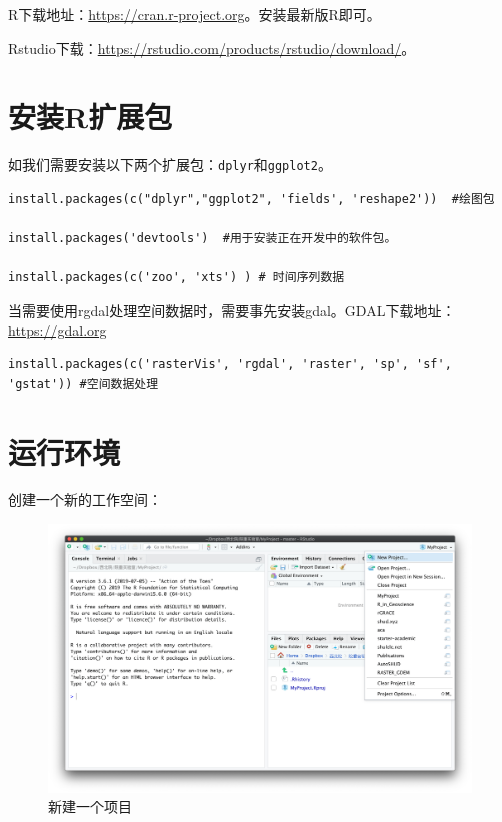 \documentclass[]{scrbook}
\begin{document}
R下载地址：\url{https://cran.r-project.org}。安装最新版R即可。

Rstudio下载：\url{https://rstudio.com/products/rstudio/download/}。

\hypertarget{ux5b89ux88c5rux6269ux5c55ux5305}{%
\section{安装R扩展包}\label{ux5b89ux88c5rux6269ux5c55ux5305}}

如我们需要安装以下两个扩展包：\texttt{dplyr}和\texttt{ggplot2}。

\begin{verbatim}
install.packages(c("dplyr","ggplot2", 'fields', 'reshape2'))  #绘图包

install.packages('devtools')  #用于安装正在开发中的软件包。

install.packages(c('zoo', 'xts') ) # 时间序列数据

\end{verbatim}

当需要使用rgdal处理空间数据时，需要事先安装gdal。GDAL下载地址：\url{https://gdal.org}

\begin{verbatim}
install.packages(c('rasterVis', 'rgdal', 'raster', 'sp', 'sf', 'gstat')) #空间数据处理
\end{verbatim}

\hypertarget{ux8fd0ux884cux73afux5883}{%
\section{运行环境}\label{ux8fd0ux884cux73afux5883}}

创建一个新的工作空间：

\begin{figure}
\centering
\includegraphics{Fig/ch1/Env1.png}
\caption{新建一个项目}
\end{figure}
\end{document}
